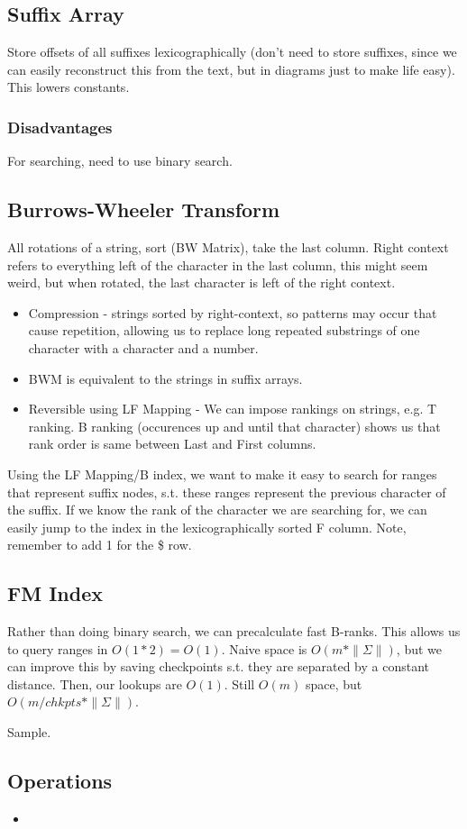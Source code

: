 \documentclass{article}
\begin{document}
\subsection{Suffix Array}
Store offsets of all suffixes lexicographically (don't need to store suffixes, since we can easily reconstruct this from the text, but in diagrams just to make life easy). This lowers constants.
\subsubsection{Disadvantages}
For searching, need to use binary search.

\subsection{Burrows-Wheeler Transform}
All rotations of a string, sort (BW Matrix), take the last column. Right context refers to everything left of the character in the last column, this might seem weird, but when rotated, the last character is left of the right context.
\begin{itemize}
    \item Compression - strings sorted by right-context, so patterns may occur that cause repetition, allowing us to replace long repeated substrings of one character with a character and a number.
    \item BWM is equivalent to the strings in suffix arrays.
    \item Reversible using LF Mapping - We can impose rankings on strings, e.g. T ranking. B ranking (occurences up and until that character) shows us that rank order is same between Last and First columns. 
\end{itemize}
Using the LF Mapping/B index, we want to make it easy to search for ranges that represent suffix nodes, s.t. these ranges represent the previous character of the suffix. If we know the rank of the character we are searching for, we can easily jump to the index in the lexicographically sorted F column. Note, remember to add 1 for the \$ row.

\subsection{FM Index}
Rather than doing binary search, we can precalculate fast B-ranks. This allows us to query ranges in $O(1*2) = O(1)$. Naive space is $O(m * \|\Sigma\|)$, but we can improve this by saving checkpoints s.t. they are separated by a constant distance. Then, our lookups are $O(1)$. Still $O(m)$ space, but $O(m/chkpts*\|\Sigma\|)$.

Sample.

\subsection{Operations}
\begin{itemize}
    \item 
\end{itemize}
\end{document}
